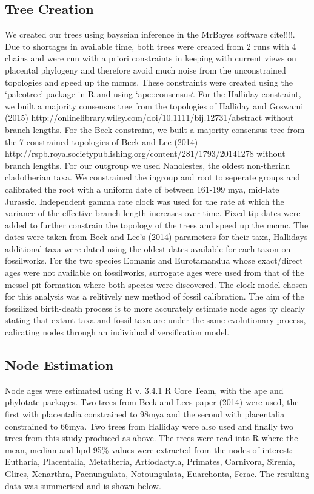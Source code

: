\documentclass[11pt,letterpaper]{article}
\begin{document}
\subsection*{Tree Creation}

We created our trees using bayseian inference in the MrBayes software cite!!!!. Due to shortages in available time, both trees were created from 2 runs with 4 chains and were run with a priori constraints in keeping with current views on placental phylogeny and therefore avoid much noise from the unconstrained topologies and speed up the mcmcs. These constraints were created using the `paleotree' package in R and using `ape::consensus`. For the Halliday constraint, we built a majority consensus tree from the topologies of Halliday and Goswami (2015) http://onlinelibrary.wiley.com/doi/10.1111/bij.12731/abstract without branch lengths. For the Beck constraint, we built a majority consensus tree from the 7 constrained topologies of Beck and Lee (2014) http://rspb.royalsocietypublishing.org/content/281/1793/20141278 without branch lengths. For our outgroup we used Nanolestes, the oldest non-therian cladotherian taxa. We constrained the ingroup and root to seperate groups and calibrated the root with a uniform date of between 161-199 mya, mid-late Jurassic. Independent gamma rate clock was used for the rate at which the variance of the effective branch length increases over time. Fixed tip dates were added to further constrain the topology of the trees and speed up the mcmc. The dates were taken from Beck and Lee's (2014) parameters for their taxa, Hallidays additional taxa were dated using the oldest dates available for each taxon on fossilworks. For the two species Eomanis and Eurotamandua whose exact/direct ages were not available on fossilworks, surrogate ages were used from that of the messel pit formation where both species were discovered. The clock model chosen for this analysis was a relitively new method of fossil calibration. The aim of the fossilized birth-death process is to more accurately estimate node ages by clearly stating that extant taxa and fossil taxa are under the same evolutionary process, calirating nodes through an individual diversification model.

\subsection*{Node Estimation}

Node ages were estimated using R v. 3.4.1 R Core Team, with the ape and phylotate packages. Two trees from Beck and Lees paper (2014) were used, the first with placentalia constrained to 98mya and the second with placentalia constrained to 66mya. Two trees from Halliday were also used and finally two trees from this study produced as above. The trees were read into R where the mean, median and hpd 95\% values were extracted from the nodes of interest: Eutharia, Placentalia, Metatheria, Artiodactyla, Primates, Carnivora, Sirenia, Glires, Xenarthra, Paenungulata, Notoungulata, Euarchonta, Ferae. The resulting data was summerised and is shown below. 
\end{document}
